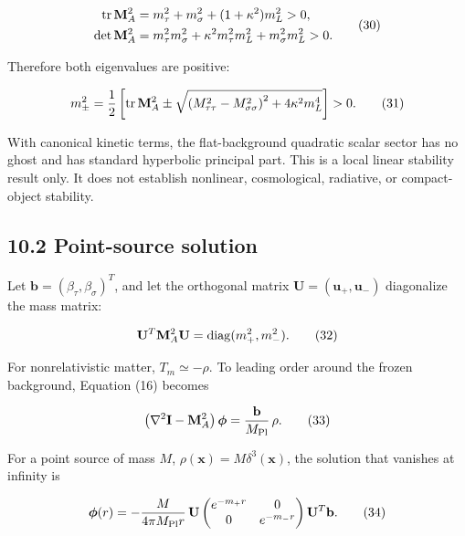\documentclass[
  american,
  11pt,
  letterpaper,
]{article}
\begin{document}
\[
\begin{aligned}
{\rm tr}\,\mathbf M_A^2
&=m_\tau^2+m_\sigma^2+(1+\kappa^2)m_L^2>0,\\
\det\mathbf M_A^2
&=m_\tau^2m_\sigma^2
+\kappa^2m_\tau^2m_L^2
+m_\sigma^2m_L^2>0 .
\end{aligned} \tag{30}
\]

Therefore both eigenvalues are positive:

\begin{equation}
m_\pm^2=\frac12\left[
{\rm tr}\,\mathbf M_A^2
\pm\sqrt{
\left(M_{\tau\tau}^2-M_{\sigma\sigma}^2\right)^2
+4\kappa^2m_L^4}
\right]>0 .
\tag{31}
\end{equation}

With canonical kinetic terms, the flat-background quadratic scalar sector has no ghost and has standard hyperbolic principal part. This is a local linear stability result only. It does not establish nonlinear, cosmological, radiative, or compact-object stability.

\subsection{10.2 Point-source solution}\label{point-source-solution}

Let \(\mathbf b=(\beta_\tau,\beta_\sigma)^T\), and let the orthogonal matrix \(\mathbf U=(\mathbf u_+,\mathbf u_-)\) diagonalize the mass matrix:

\begin{equation}
\mathbf U^T\mathbf M_A^2\mathbf U
={\rm diag}(m_+^2,m_-^2).
\tag{32}
\end{equation}

For nonrelativistic matter, \(T_m\simeq-\rho\). To leading order around the frozen background, Equation (16) becomes

\begin{equation}
\left(\nabla^2\mathbf I-\mathbf M_A^2\right)\boldsymbol\phi
=\frac{\mathbf b}{M_{\rm Pl}}\,\rho .
\tag{33}
\end{equation}

For a point source of mass \(M\), \(\rho(\mathbf x)=M\delta^3(\mathbf x)\), the solution that vanishes at infinity is

\begin{equation}
\boldsymbol\phi(r)=
-\frac{M}{4\pi M_{\rm Pl}r}\,
\mathbf U
\begin{pmatrix}
e^{-m_+r}&0\\
0&e^{-m_-r}
\end{pmatrix}
\mathbf U^T\mathbf b .
\tag{34}
\end{equation}
\end{document}

